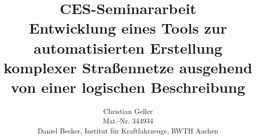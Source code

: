 \documentclass[11pt,
	a4paper,
	ngerman,
	bibliography=totoc,
	captions=tableheading,
	headings=normal,
	parskip=half*,
	chapterentrydots=true,
	numbers=noenddot
	]{scrreprt}
\begin{document}
%
\title{CES-Seminararbeit  \vspace{4cm} \\ Entwicklung eines Tools zur automatisierten Erstellung komplexer Straßennetze ausgehend von einer logischen Beschreibung}
\author{Christian Geller \\  Mat.-Nr. 344934 \\ Daniel Becker, Institut für Kraftfahrzeuge, RWTH Aachen}
\maketitle

\thispagestyle{empty}
{}
\pagestyle{plain}
\setcounter{page}{2}
\renewcommand{\contentsname}{Inhalt}
\tableofcontents
\newpage
\pagestyle{ika}


\setlength\LTleft{-6pt}
\setlength\LTright{0pt} 


\newpage
\pagestyle{plain}
\printbibliography[
	heading=bibnumbered,
	title=Literaturverzeichnis
]
\newpage
\pagestyle{apx}
%
\end{document}
